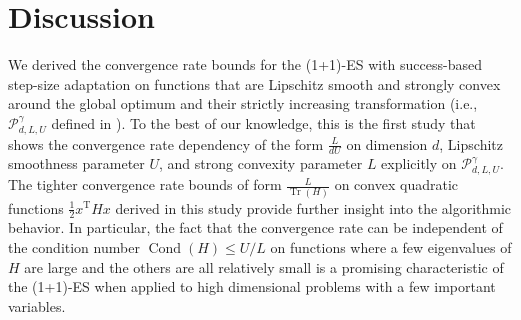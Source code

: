 \documentclass[journal]{IEEEtran}
\DeclareMathOperator{\Tr}{Tr}     %
\DeclareMathOperator{\Cond}{Cond} %
\providecommand{\T}{\mathrm{T}} %
\renewcommand{\leq}{\leqslant} %
\theoremstyle{definition}
\newcommand{\aup}{\alpha_{\uparrow}}
\begin{document}



\section{Discussion}

We derived the convergence rate bounds for the (1+1)-ES with success-based step-size adaptation on functions that are Lipschitz smooth and strongly convex around the global optimum and their strictly increasing transformation (i.e., $\mathcal{P}_{d, L, U}^{\gamma}$ defined in ). To the best of our knowledge, this is the first study that shows the convergence rate dependency of the form $\frac{L}{d U}$ on dimension $d$, Lipschitz smoothness parameter $U$, and strong convexity parameter $L$ explicitly on $\mathcal{P}_{d, L, U}^{\gamma}$. The tighter convergence rate bounds of form $\frac{L}{\Tr(H)}$ on convex quadratic functions $\frac12 x^\T H x$ derived in this study provide further insight into the algorithmic behavior. In particular, the fact that the convergence rate can be independent of the condition number $\Cond(H) {\leq} U / L$ on functions where a few eigenvalues of $H$ are large and the others are all relatively small is a promising characteristic of the (1+1)-ES when applied to high dimensional problems with a few important variables.
\end{document}
